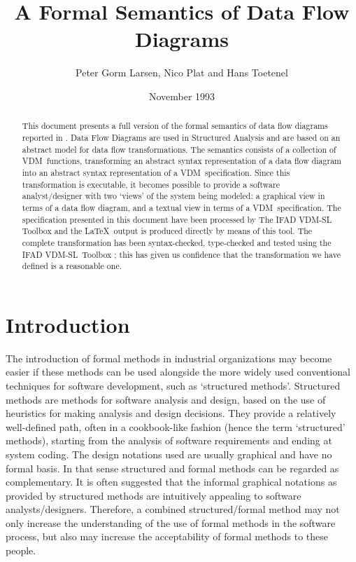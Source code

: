 \documentclass[11pt]{article}
\newcommand{\VDM}{{\small VDM}}
\begin{document}
\title{A Formal Semantics of Data Flow Diagrams}
\author{Peter Gorm Larsen, Nico Plat and Hans Toetenel}
\date{November 1993}
\maketitle
\begin{abstract}
This document presents a full version of the
formal semantics of data flow diagrams reported in \cite{Larsen&93b}.
Data Flow Diagrams are used in Structured Analysis and are
 based on an abstract model for data flow transformations.
The semantics consists of a collection of \VDM\ functions,
transforming an abstract syntax representation of a data flow
diagram into an abstract syntax representation of a \VDM\
specification. Since this transformation is executable, it
becomes possible to provide a software analyst/designer with two `views' of
the system being modeled: a graphical view in terms of a data
flow diagram, and a textual view in terms of a \VDM\
specification. The specification presented in this document have been
processed by The IFAD VDM-SL Toolbox \cite{Lassen93} and the \LaTeX\ output is
produced directly by means of this tool. The complete transformation has
been syntax-checked, type-checked and tested using the
{\small IFAD VDM-SL}\ Toolbox \cite{Lassen93}; this has given us
confidence that the transformation we have defined is a reasonable one.
\end{abstract}
\newpage
\tableofcontents
\newpage
\section{Introduction}

The introduction of formal methods in industrial organizations
may become easier if these methods can be used alongside the
more widely used conventional techniques for software development,
such as `structured methods'.
Structured methods are methods for software analysis and design,
based on the use of heuristics for making analysis and design decisions.
They provide a relatively well-defined path, often in a cookbook-like
fashion (hence the term `structured' methods), starting from the analysis
of software requirements and ending at system coding.
The design notations used are usually graphical and have no formal basis.
In that sense structured and formal methods can be regarded as complementary.
It is often suggested that the informal graphical notations as provided by
structured methods are intuitively appealing to software analysts/designers.
Therefore, a combined structured/formal method may not only increase the
understanding of the use of formal methods in the software process, but 
also may increase the acceptability of formal methods to these people.
\end{document}
